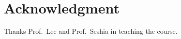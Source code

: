 \documentclass[conference, 10pt]{IEEEtran}
\begin{document}

\section*{Acknowledgment}
Thanks Prof.\, Lee and Prof.\, Seshia in teaching the course.



%
%
%

\end{document}
